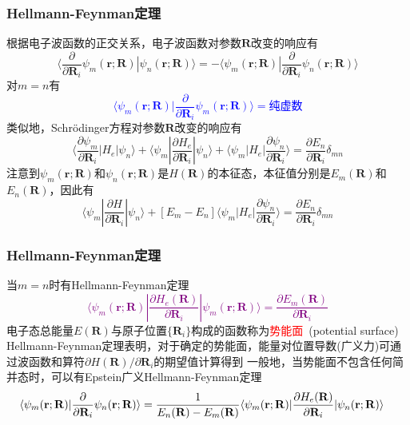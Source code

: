 \frame
{
	\frametitle{\textrm{Hellmann-Feynman}定理}
	根据电子波函数的正交关系，电子波函数对参数$\mathbf{R}$改变的响应有
	\begin{displaymath}
		\langle\dfrac{\partial}{\partial{\mathbf{R}_i}}\psi_m(\mathbf{r};\mathbf{R})|\psi_n(\mathbf{r};\mathbf{R})\rangle=-\langle\psi_m(\mathbf{r};\mathbf{R})|\dfrac{\partial}{\partial{\mathbf{R}_i}}\psi_n(\mathbf{r};\mathbf{R})\rangle
	\end{displaymath}
	对$m=n$有
	\textcolor{blue}{
		\begin{displaymath}
			\langle\psi_m(\mathbf{r};\mathbf{R})|\dfrac{\partial}{\partial{\mathbf{R}_i}}\psi_m(\mathbf{r};\mathbf{R})\rangle=\mbox{纯虚数}
		\end{displaymath} }
		类似地，\textrm{Schr\"odinger}方程对参数$\mathbf{R}$改变的响应有
		\begin{displaymath}
			\langle\dfrac{\partial\psi_m}{\partial{\mathbf{R}_i}}|H_e|\psi_n\rangle+\langle\psi_m|\dfrac{\partial H_e}{\partial{\mathbf{R}_i}}|\psi_n\rangle+\langle\psi_m|H_e|\dfrac{\partial\psi_n}{\partial{\mathbf{R}_i}}\rangle=\dfrac{\partial E_n}{\partial\mathbf{R}_i}\delta_{mn}
		\end{displaymath}
		注意到$\psi_m(\mathbf{r};\mathbf{R})$和$\psi_n(\mathbf{r};\mathbf{R})$是$H(\mathbf{R})$的本征态，本征值分别是$E_m(\mathbf{R})$和$E_n(\mathbf{R})$，因此有
		\begin{displaymath}
			\langle\psi_m|\dfrac{\partial H}{\partial{\mathbf{R}_i}}|\psi_n\rangle+[E_m-E_n]\langle\psi_m|H_e|\dfrac{\partial\psi_n}{\partial{\mathbf{R}_i}}\rangle=\dfrac{\partial E_n}{\partial\mathbf{R}_i}\delta_{mn}
		\end{displaymath}
}

\frame
{
	\frametitle{\textrm{Hellmann-Feynman}定理}
	当$m=n$时有\textrm{Hellmann-Feynman}定理
	\textcolor{purple}{
	\begin{displaymath}
		\langle\psi_m(\mathbf{r};\mathbf{R})|\dfrac{\partial H_e(\mathbf{R})}{\partial{\mathbf{R}_i}}|\psi_m(\mathbf{r};\mathbf{R})\rangle=\dfrac{\partial E_m(\mathbf{R})}{\partial\mathbf{R}_i}
	\end{displaymath}}
	电子态总能量$E(\mathbf{R})$与原子位置$\{\mathbf{R}_i\}$构成的函数称为\textcolor{red}{势能面}~(\textrm{potential surface})
	\vskip 8pt
	\textrm{Hellmann-Feynman}定理表明，对于确定的势能面，能量对位置导数(广义力)可通过波函数和算符$\partial H(\mathbf{R})/\partial\mathbf{R}_i$的期望值计算得到
	\vskip 5pt
	一般地，当势能面不包含任何简并态时，可以有\textrm{Epstein}广义\textrm{Hellmann-Feynman}定理
	\begin{displaymath}
		\hspace*{-10pt}
		\langle\psi_m(\mathbf{r};\mathbf{R})|\dfrac{\partial}{\partial{\mathbf{R}_i}}\psi_n(\mathbf{r};\mathbf{R})\rangle=\dfrac1{E_n(\mathbf{R})-E_m(\mathbf{R})}\langle\psi_m(\mathbf{r};\mathbf{R})|\dfrac{\partial H_e(\mathbf{R})}{\partial{\mathbf{R}_i}}|\psi_n(\mathbf{r};\mathbf{R})\rangle
	\end{displaymath}
}

